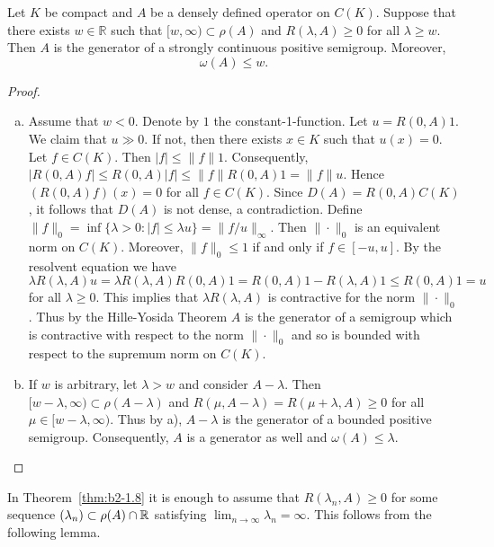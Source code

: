 \begin{theorem}\label{thm:b2-1.8}
Let $K$ be compact and $A$ be a densely defined operator on $C(K)$.
Suppose that there exists $w \in \mathbb{R}$ such that $[w,\infty) \subset \rho(A)$ and $R(\lambda,A) \geq 0$ for all $\lambda \geq w$.
Then $A$ is the generator of a strongly continuous positive semigroup.
Moreover,
\begin{equation}\label{eq:b2-1.3}
    \omega(A) \leq w.
\end{equation}
\end{theorem}

\begin{proof}
\begin{enumerate}[a)]
\item \label{thm:b2-1.8-1}
Assume that $w < 0$.
Denote by $1$ the constant-1-function.
Let $u = R(0,A)1$.
We claim that $u \gg 0$.
If not, then there exists $x \in K$ such that $u(x) = 0$.
Let $f \in C(K)$.
Then $|f| \leq \|f\|1$.
Consequently, $|R(0,A)f| \leq R(0,A)|f| \leq \|f\|R(0,A)1 = \|f\|u$.
Hence $(R(0,A)f)(x) = 0$ for all $f \in C(K)$.
Since $D(A) = R(0,A)C(K)$, it follows that $D(A)$ is not dense, a contradiction.
Define $\|f\|_{0} = \inf \{\lambda > 0 : |f| \leq \lambda u\} = \|f/u\|_{\infty}$.
Then $\|\cdot\|_{0}$ is an equivalent norm on $C(K)$.
Moreover, $\|f\|_{0} \leq 1$ if and only if $f \in [-u,u]$.
By the resolvent equation we have $\lambda R(\lambda,A)u = \lambda R(\lambda,A)R(0,A)1 = R(0,A)1 - R(\lambda,A)1 \leq R(0,A)1 = u$ for all $\lambda \geq 0$.
This implies that $\lambda R(\lambda,A)$ is contractive for the norm $\|\cdot\|_{0}$.
Thus by the Hille-Yosida Theorem $A$ is the generator of a semigroup which is contractive with respect to the norm $\|\cdot\|_{0}$ and so is bounded with respect to the supremum norm on $C(K)$.

\item \label{thm:b2-1.8-2}
If $w$ is arbitrary, let $\lambda > w$ and consider $A - \lambda$.
Then $[w-\lambda,\infty) \subset \rho(A-\lambda)$ and $R(\mu,A-\lambda) = R(\mu+\lambda,A) \geq 0$ for all $\mu \in [w-\lambda,\infty)$.
Thus by a), $A - \lambda$ is the generator of a bounded positive semigroup.
Consequently, $A$ is a generator as well and $\omega(A) \leq \lambda$.
\end{enumerate}
\end{proof}

In Theorem~\ref{thm:b2-1.8} it is enough to assume that $R(\lambda_{n},A) \geq 0$ for some sequence $(\lambda_{n}) \subset \rho(A) \cap \mathbb{R}$ satisfying $\lim_{n \to \infty} \lambda_{n} = \infty$.
This follows from the following lemma.


